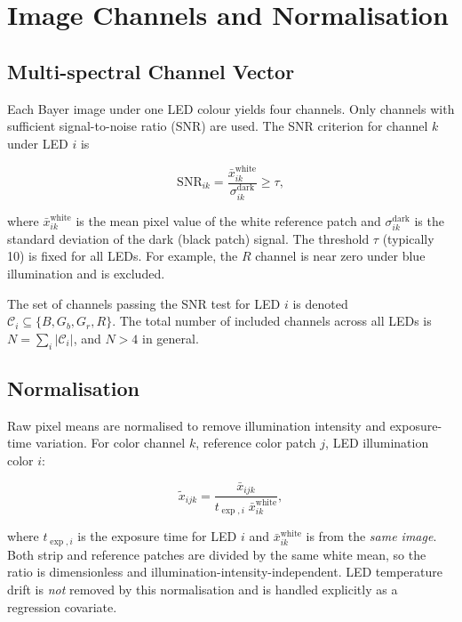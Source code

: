\documentclass[11pt, a4paper]{article}
\begin{document}
\section{Image Channels and Normalisation}

\subsection{Multi-spectral Channel Vector}

Each Bayer image under one LED colour yields four channels.
Only channels with sufficient signal-to-noise ratio (SNR) are used.
The SNR criterion for channel $k$ under LED $i$ is

\begin{equation}
  \mathrm{SNR}_{ik}
    = \frac{\bar{x}_{ik}^{\mathrm{white}}}{\sigma_{ik}^{\mathrm{dark}}}
    \geq \tau,
  \label{eq:snr}
\end{equation}

where $\bar{x}_{ik}^{\mathrm{white}}$ is the mean pixel value of the
white reference patch and $\sigma_{ik}^{\mathrm{dark}}$ is the
standard deviation of the dark (black patch) signal.
The threshold $\tau$ (typically 10) is fixed for all LEDs.
For example, the $R$ channel is near zero under blue illumination and
is excluded.

The set of channels passing the SNR test for LED $i$ is denoted
$\mathcal{C}_i \subseteq \{B, G_b, G_r, R\}$.
The total number of included channels across all LEDs is
$N = \sum_i |\mathcal{C}_i|$, and $N > 4$ in general.

\subsection{Normalisation}

Raw pixel means are normalised to remove illumination intensity and
exposure-time variation.
For color channel $k$, reference color patch $j$, LED illumination color $i$:

\begin{equation}
  \tilde{x}_{ijk}
    = \frac{\bar{x}_{ijk}}{t_{\exp,i}\;\bar{x}_{ik}^{\mathrm{white}}},
  \label{eq:normalise}
\end{equation}

where $t_{\exp,i}$ is the exposure time for LED $i$ and
$\bar{x}_{ik}^{\mathrm{white}}$ is from the \emph{same image}.
Both strip and reference patches are divided by the same white mean,
so the ratio is dimensionless and illumination-intensity-independent.
LED temperature drift is \emph{not} removed by this normalisation and
is handled explicitly as a regression covariate.
\end{document}
